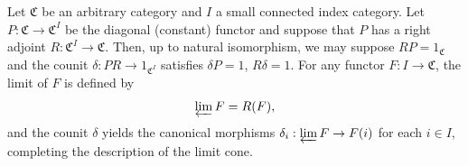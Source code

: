 Let $\mathfrak{C}$ be an arbitrary category and $I$ a small connected index category. Let $P : \mathfrak{C} \rightarrow \mathfrak{C}^I$ be the diagonal (constant) functor and suppose that $P$ has a right adjoint $R : \mathfrak{C}^I \rightarrow \mathfrak{C}$. Then, up to natural isomorphism, we may suppose $RP = 1_{\mathfrak{C}}$ and the counit $\delta : PR \rightarrow 1_{\mathfrak{C}^I}$ satisfies $\delta P = 1$, $R\delta = 1$. For any functor $F : I \rightarrow \mathfrak{C}$, the limit of $F$ is defined by
$$
\varprojlim F = R(F),
$$
and the counit $\delta$ yields the canonical morphisms $\delta_i : \varprojlim F \rightarrow F(i)$ for each $i \in I$, completing the description of the limit cone.